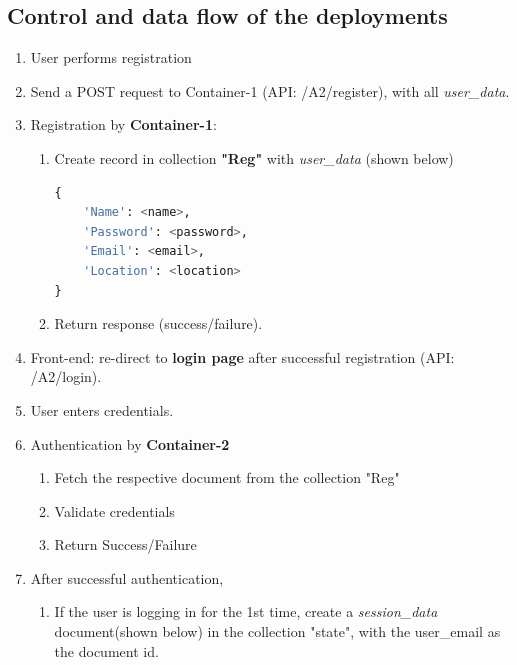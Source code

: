 \subsection{Control and data flow of the deployments}
\begin{enumerate}
    \item User performs registration
    \item Send a POST request to Container-1 (API: /A2/register), with all \textit{user\_data}.
    \item Registration by \textbf{Container-1}:
    \begin{enumerate}
        \item Create record in collection \textbf{"Reg"} with \textit{user\_data} (shown below)

\lstset{style=mystyle}

\begin{lstlisting}[language=Python]
{
    'Name': <name>,
    'Password': <password>,
    'Email': <email>,
    'Location': <location>
}

\end{lstlisting}
        \item Return response (success/failure).
    \end{enumerate}
    \item Front-end: re-direct to \textbf{login page} after successful registration (API: /A2/login).
    \item User enters credentials.
    \item Authentication by \textbf{Container-2}
    \begin{enumerate}
        \item Fetch the respective document from the collection "Reg"  
        \item Validate credentials
        \item Return Success/Failure
    \end{enumerate}
    \item After successful authentication, 
    \begin{enumerate}
        \item If the user is logging in for the 1st time, create a \textit{session\_data} document(shown below) in the collection "state", with the user\_email as the document id.


\end{enumerate}
\end{enumerate}
